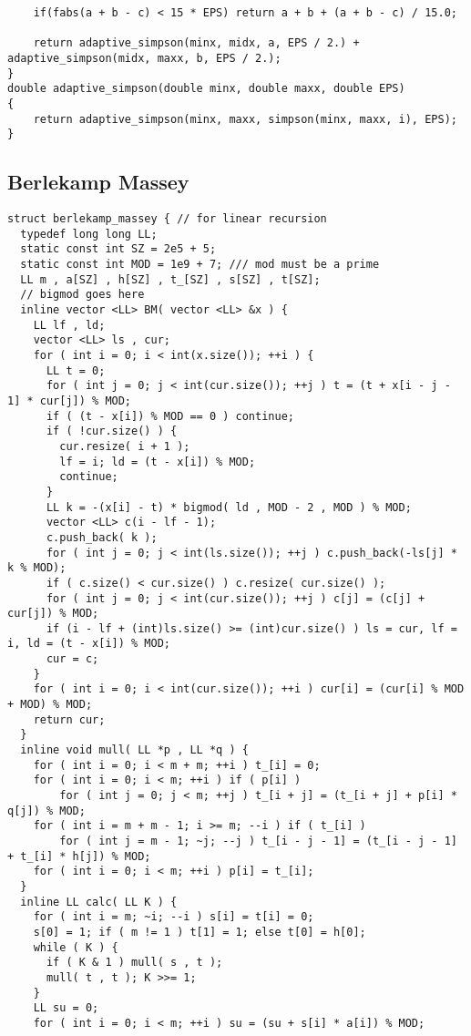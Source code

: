 \documentclass[FSZ,a4paper,onesided]{article}
\begin{document}
\begin{multicols*}{\COLS}
\begin{lstlisting}
    if(fabs(a + b - c) < 15 * EPS) return a + b + (a + b - c) / 15.0;

    return adaptive_simpson(minx, midx, a, EPS / 2.) + adaptive_simpson(midx, maxx, b, EPS / 2.);
}
double adaptive_simpson(double minx, double maxx, double EPS)
{
    return adaptive_simpson(minx, maxx, simpson(minx, maxx, i), EPS);
}

\end{lstlisting}
\subsection{Berlekamp Massey}
\begin{lstlisting}
struct berlekamp_massey { // for linear recursion
  typedef long long LL;
  static const int SZ = 2e5 + 5;
  static const int MOD = 1e9 + 7; /// mod must be a prime
  LL m , a[SZ] , h[SZ] , t_[SZ] , s[SZ] , t[SZ];
  // bigmod goes here
  inline vector <LL> BM( vector <LL> &x ) {
    LL lf , ld;
    vector <LL> ls , cur;
    for ( int i = 0; i < int(x.size()); ++i ) {
      LL t = 0;
      for ( int j = 0; j < int(cur.size()); ++j ) t = (t + x[i - j - 1] * cur[j]) % MOD;
      if ( (t - x[i]) % MOD == 0 ) continue;
      if ( !cur.size() ) {
        cur.resize( i + 1 );
        lf = i; ld = (t - x[i]) % MOD;
        continue;
      }
      LL k = -(x[i] - t) * bigmod( ld , MOD - 2 , MOD ) % MOD;
      vector <LL> c(i - lf - 1);
      c.push_back( k );
      for ( int j = 0; j < int(ls.size()); ++j ) c.push_back(-ls[j] * k % MOD);
      if ( c.size() < cur.size() ) c.resize( cur.size() );
      for ( int j = 0; j < int(cur.size()); ++j ) c[j] = (c[j] + cur[j]) % MOD;
      if (i - lf + (int)ls.size() >= (int)cur.size() ) ls = cur, lf = i, ld = (t - x[i]) % MOD;
      cur = c;
    }
    for ( int i = 0; i < int(cur.size()); ++i ) cur[i] = (cur[i] % MOD + MOD) % MOD;
    return cur;
  }
  inline void mull( LL *p , LL *q ) {
    for ( int i = 0; i < m + m; ++i ) t_[i] = 0;
    for ( int i = 0; i < m; ++i ) if ( p[i] )
        for ( int j = 0; j < m; ++j ) t_[i + j] = (t_[i + j] + p[i] * q[j]) % MOD;
    for ( int i = m + m - 1; i >= m; --i ) if ( t_[i] )
        for ( int j = m - 1; ~j; --j ) t_[i - j - 1] = (t_[i - j - 1] + t_[i] * h[j]) % MOD;
    for ( int i = 0; i < m; ++i ) p[i] = t_[i];
  }
  inline LL calc( LL K ) {
    for ( int i = m; ~i; --i ) s[i] = t[i] = 0;
    s[0] = 1; if ( m != 1 ) t[1] = 1; else t[0] = h[0];
    while ( K ) {
      if ( K & 1 ) mull( s , t );
      mull( t , t ); K >>= 1;
    }
    LL su = 0;
    for ( int i = 0; i < m; ++i ) su = (su + s[i] * a[i]) % MOD;

\end{lstlisting}
\end{multicols*}
\end{document}
